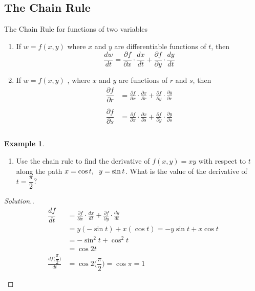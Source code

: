 \documentclass[11pt,a4paper]{article}
\theoremstyle{definition}
\newtheorem{exa}[thm]{Example}
\newenvironment{solution}
  {\renewcommand{\qedsymbol}{}\begin{proof}[\textit{Solution}.]}
  {\end{proof}}
\begin{document}
\subsection{The Chain Rule}
The Chain Rule for functions of two variables
\begin{enumerate}
\item If $w = f(x,y)$ where $x$ and $y$ are differentiable functions of $t$, then $$\dfrac{d w}{d t} = \frac{\partial f}{\partial x}\cdot \frac{dx}{dt} + \frac{\partial f}{\partial y}\cdot \frac{dy}{dt}$$

\item If $w = f(x,y)$ , where $x$ and $y$ are functions of $r$ and $s$, then 
\begin{align*}
\dfrac{\partial f}{\partial r} & = \frac{\partial f}{\partial x}\cdot \frac{\partial x}{\partial r}  + \frac{\partial f}{\partial y}\cdot \frac{\partial y}{\partial r}\\\\
\dfrac{\partial f}{\partial s} & = \frac{\partial f}{\partial x}\cdot \frac{\partial x}{\partial s} + \frac{\partial f}{\partial y}\cdot \frac{\partial y}{\partial s}\\\\
\end{align*}
\end{enumerate}

\begin{exa}
\begin{enumerate}
\item Use the chain rule to find the derivative of $f(x,y) = xy$ with respect to $t$ along the path $x = \cos t, \hspace{0.2cm} y = \sin t$. What is the value of the derivative of $t = \dfrac{\pi}{2}$?
\end{enumerate}
\end{exa}

\begin{solution}
\begin{align*}
\dfrac{d f}{d t} & = \frac{\partial f}{\partial x}\cdot \frac{dx}{dt} + \frac{\partial f}{\partial y}\cdot \frac{dy}{dt}\\
& = y(-\sin t) + x(\cos t) = -y \sin t + x\cos t\\
& = -\sin^2 t + \cos^2 t\\
& = \cos 2t\\
\frac{d f\Big(\dfrac{\pi}{2}\Big)}{dt}  & = \cos 2\Big(\dfrac{\pi}{2}\Big) = \cos \pi =  1\\\\
\end{align*}
\end{solution}
\end{document}

